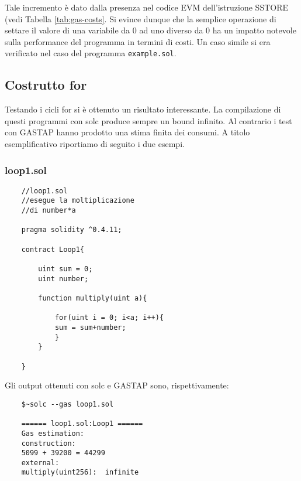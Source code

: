     
    Tale incremento è dato dalla presenza nel codice EVM dell'istruzione SSTORE (vedi Tabella \ref{tab:gas-costs}. Si evince dunque che la semplice operazione di settare il valore di una variabile da 0 ad uno diverso da 0 ha un impatto notevole sulla performance del programma in termini di costi. Un caso simile si era verificato nel caso del programma \verb|example.sol|.

    \subsection{Costrutto for}
    
    Testando i cicli for si è ottenuto un risultato interessante. La compilazione di questi programmi con solc produce sempre un bound infinito. Al contrario i test con GASTAP hanno prodotto una stima finita dei consumi. A titolo esemplificativo riportiamo di seguito i due esempi.
    
    \subsubsection{loop1.sol}
    
    \begin{minipage}{\linewidth}
    \begin{lstlisting}
    //loop1.sol
    //esegue la moltiplicazione
    //di number*a

    pragma solidity ^0.4.11;

    contract Loop1{

        uint sum = 0;
        uint number;
        
        function multiply(uint a){
            
            for(uint i = 0; i<a; i++){
            sum = sum+number;
            }
        }

    }
    \end{lstlisting}
    \end{minipage}

    Gli output ottenuti con solc e GASTAP sono, rispettivamente:
    
    \begin{minipage}{\linewidth}
    \begin{lstlisting}
    $~solc --gas loop1.sol
    
    ====== loop1.sol:Loop1 ======
    Gas estimation:
    construction:
    5099 + 39200 = 44299
    external:
    multiply(uint256):	infinite
    \end{lstlisting}
    \end{minipage}

